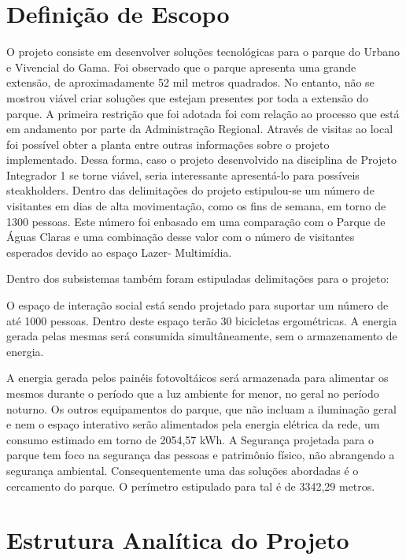 \section{Definição de Escopo}

	O projeto consiste em desenvolver soluções tecnológicas para o parque do Urbano e Vivencial do Gama. Foi observado que o parque apresenta uma grande extensão, de aproximadamente 52 mil metros quadrados. No entanto, não se mostrou viável criar soluções que estejam presentes por toda a extensão do parque. A primeira restrição que foi adotada foi com relação ao processo que está em andamento por parte da Administração Regional. Através de visitas ao local foi possível obter a planta entre outras informações sobre o projeto implementado. Dessa forma, caso o projeto desenvolvido na disciplina de Projeto Integrador 1 se torne viável, seria interessante apresentá-lo para possíveis steakholders. 
	Dentro das delimitações do projeto estipulou-se um número de visitantes em dias de alta movimentação, como os fins de semana, em torno de 1300 pessoas. Este número foi enbasado em uma comparação com o Parque de Águas Claras e uma combinação desse valor com o número de visitantes esperados devido ao espaço Lazer- Multimídia. 

	Dentro dos subsistemas também foram estipuladas delimitações para o projeto: 

	O espaço de interação social está sendo projetado para suportar um número de até 1000 pessoas. Dentro deste espaço terão 30 bicicletas ergométricas. A energia gerada pelas mesmas será consumida simultâneamente, sem o armazenamento de energia. 

	A energia gerada pelos painéis fotovoltáicos será armazenada para alimentar os mesmos durante o período que a luz ambiente for menor, no geral no período noturno. Os outros equipamentos do parque, que não incluam a iluminação geral e nem o espaço interativo serão alimentados pela energia elétrica da rede, um consumo estimado em torno de  2054,57 kWh. A Segurança projetada para o parque tem foco na segurança das pessoas e patrimônio físico, não abrangendo a segurança ambiental. Consequentemente uma das soluções abordadas é o cercamento do parque. O perímetro estipulado para tal é de 3342,29 metros. 


\section{Estrutura Anal\'itica do Projeto}

